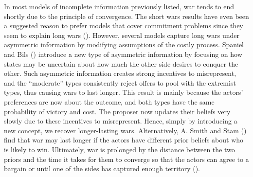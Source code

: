 \documentclass[
  12pt,
]{article}
\theoremstyle{plain}
\theoremstyle{plain}
\theoremstyle{remark}
\begin{document}
In most models of incomplete information previously listed, war tends to
end shortly due to the principle of convergence. The short wars results
have even been a suggested reason to prefer models that cover commitment
problems since they seem to explain long wars
().
However, several models capture long wars under asymmetric information
by modifying assumptions of the costly process. Spaniel and Bils
() introduce a new
type of asymmetric information by focusing on how states may be
uncertain about how much the other side desires to conquer the other.
Such asymmetric information creates strong incentives to misrepresent,
and the ``moderate'' types consistently reject offers to pool with the
extremist types, thus causing wars to last longer. This result is mainly
because the actors' preferences are now about the outcome, and both
types have the same probability of victory and cost. The proposer now
updates their beliefs very slowly due to these incentives to
misrepresent. Hence, simply by introducing a new concept, we recover
longer-lasting wars. Alternatively, A. Smith and Stam
() find that war may
last longer if the actors have different prior beliefs about who is
likely to win. Ultimately, war is prolonged by the distance between the
two priors and the time it takes for them to converge so that the actors
can agree to a bargain or until one of the sides has captured enough
territory ().
\end{document}

